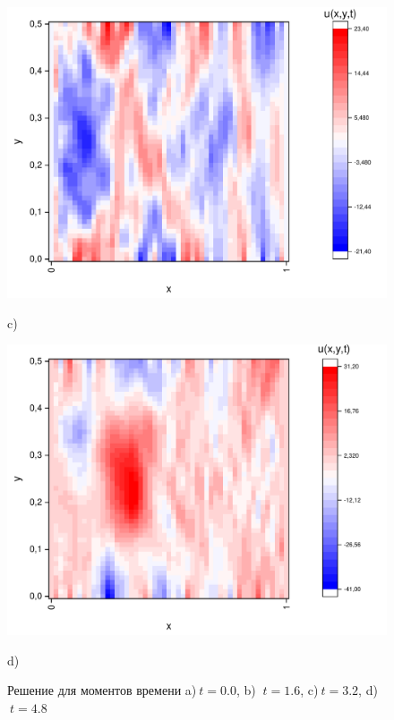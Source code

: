 \documentclass[a4paper,12pt]{article}
\begin{document}
\begin{figure}[h!]
\begin{center}
\begin{minipage}[h]{0.23\linewidth}
		\end{minipage}
		\begin{minipage}[h]{0.23\linewidth}
			\includegraphics[width=\textwidth]{graphs/graphs_a/v2/wave_t-16_v2.pdf} \begin{center}	c)	\end{center}
		\end{minipage}
		\begin{minipage}[h]{0.23\linewidth}
			\includegraphics[width=\textwidth]{graphs/graphs_a/v2/wave_t-24_v2.pdf} \begin{center}	d)	\end{center}
		\end{minipage}
	\end{center}
	\caption{Решение для моментов времени a)$\ t = 0.0$, b) $\ t = 1.6$, c)$\ t = 3.2$, d)$\ t = 4.8$}
\end{figure}
\end{document}
